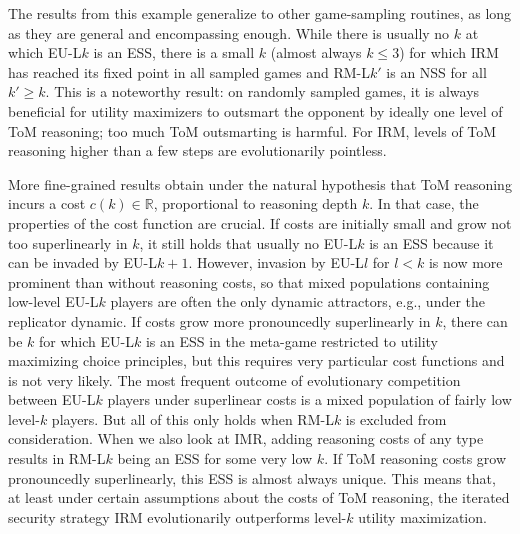 \documentclass{llncs}
\begin{document}
The results from this example generalize to other game-sampling
routines, as long as they are general and encompassing enough.  While
there is usually no $k$ at which EU-L$k$ is an ESS, there is a small
$k$ (almost always $k\le 3$) for which IRM has reached its fixed point
in all sampled games and RM-L$k'$ is an NSS for all $k' \ge k$. This
is a noteworthy result: on randomly sampled games, it is always
beneficial for utility maximizers to outsmart the opponent by ideally
one level of ToM reasoning; too much ToM outsmarting is harmful. For
IRM, levels of ToM reasoning higher than a few steps are
evolutionarily pointless.

More fine-grained results obtain under the natural hypothesis that ToM
reasoning incurs a cost $c(k) \in \mathds{R}$, proportional to
reasoning depth $k$. In that case, the properties of the cost function
are crucial. If costs are initially small and grow not too
superlinearly in $k$, it still holds that usually no EU-L$k$ is an ESS
because it can be invaded by EU-L$k+1$. However, invasion by EU-L$l$
for $l < k$ is now more prominent than without reasoning costs, so
that mixed populations containing low-level EU-L$k$ players are often
the only dynamic attractors, e.g., under the replicator dynamic. If
costs grow more pronouncedly superlinearly in $k$, there can be $k$
for which EU-L$k$ is an ESS in the meta-game restricted to utility
maximizing choice principles, but this requires very particular cost
functions and is not very likely. The most frequent outcome of
evolutionary competition between EU-L$k$ players under superlinear
costs is a mixed population of fairly low level-$k$ players. But all
of this only holds when RM-L$k$ is excluded from consideration. When
we also look at IMR, adding reasoning costs of any type results in
RM-L$k$ being an ESS for some very low $k$. If ToM reasoning costs
grow pronouncedly superlinearly, this ESS is almost always
unique. This means that, at least under certain assumptions about the
costs of ToM reasoning, the iterated security strategy IRM
evolutionarily outperforms level-$k$ utility maximization.
\end{document}
